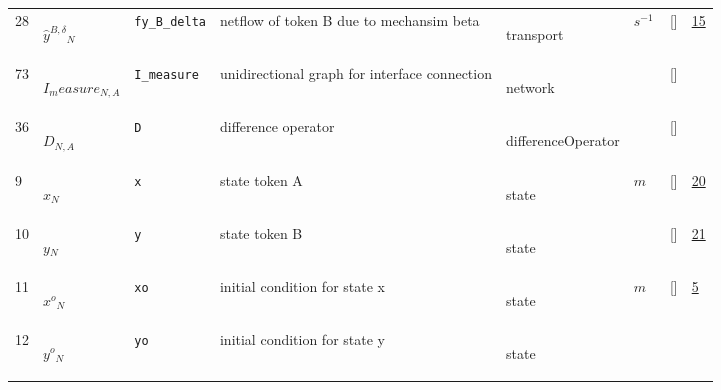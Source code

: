 \begin{longtable}{|p{1cm}|p{3cm}|p{3cm}|p{7cm}|p{3.0cm}|p{3cm}|p{2cm}|p{1cm}|}
                 \\
    28
             & \hypertarget{"v:28"}{ $ {{\hat{y}^{B,\delta}}}{_{N}} $}
             & \verb|fy_B_delta|
             & netflow of token B due to mechansim beta
             & \begin{lay}transport \end{lay}
             & $ s^{-1} \, $
             & []
             & \hyperlink{"e:15"}{ 15 }
                 \\
    73
             & \hypertarget{"v:73"}{ $ {I_measure}{_{N, A}} $}
             & \verb|I_measure|
             & unidirectional graph for interface connection
             & \begin{lay}network \end{lay}
             & $  $
             & []
             & \\
    36
             & \hypertarget{"v:36"}{ $ {D}{_{N, A}} $}
             & \verb|D|
             & difference operator 
             & \begin{lay}differenceOperator \end{lay}
             & $  $
             & []
             & \\
    9
             & \hypertarget{"v:9"}{ $ {x}{_{N}} $}
             & \verb|x|
             & state token A
             & \begin{lay}state \end{lay}
             & $ m  $
             & []
             & \hyperlink{"e:20"}{ 20 }
                 \\
    10
             & \hypertarget{"v:10"}{ $ {y}{_{N}} $}
             & \verb|y|
             & state token B
             & \begin{lay}state \end{lay}
             & $  $
             & []
             & \hyperlink{"e:21"}{ 21 }
                 \\
    11
             & \hypertarget{"v:11"}{ $ {{x^o}}{_{N}} $}
             & \verb|xo|
             & initial condition for state x
             & \begin{lay}state \end{lay}
             & $ m  $
             & []
             & \hyperlink{"e:5"}{ 5 }
                 \\
    12
             & \hypertarget{"v:12"}{ $ {{y^o}}{_{N}} $}
             & \verb|yo|
             & initial condition for state y
             & \begin{lay}state \end{lay}

\end{longtable}

